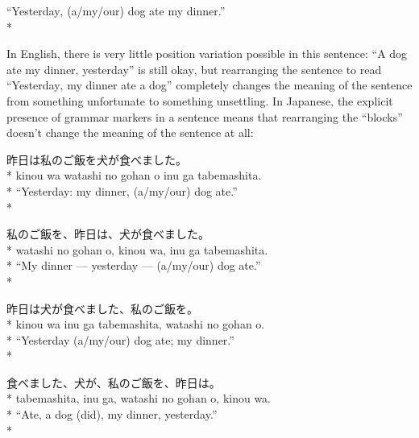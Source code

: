 \documentclass[11pt, b5paper, twoside, openright, onecolumn]{book}
\newenvironment{exampleblock}{
\setlength{\parindent}{0.6in}
\begin{minipage}[t]{\dimexpr\textwidth-\parindent}}
{\end{minipage}}
\begin{document}
\vspace{0.4cm}
\begin{exampleblock}
“Yesterday‚ (a/my/our) dog ate my dinner.” \\* 
\end{exampleblock}
\vspace{0.2cm}

In English‚ there is very little position variation possible in this sentence: “A dog ate my dinner‚ yesterday” is still okay‚ but rearranging the sentence to read “Yesterday‚ my dinner ate a dog” completely changes the meaning of the sentence from something unfortunate to something unsettling. In Japanese‚ the explicit presence of grammar markers in a sentence means that rearranging the “blocks” doesn’t change the meaning of the sentence at all:

\vspace{0.4cm}
\begin{exampleblock}
昨日は私のご飯を犬が食べました。 \\* 
kinou wa watashi no gohan o inu ga tabemashita. \\* 
“Yesterday: my dinner‚ (a/my/our) dog ate.” \\* 
\end{exampleblock}
\vspace{0.2cm}

\begin{exampleblock}
私のご飯を、昨日は、犬が食べました。 \\* 
watashi no gohan o‚ kinou wa‚ inu ga tabemashita. \\* 
“My dinner — yesterday — (a/my/our) dog ate.” \\* 
\end{exampleblock}
\vspace{0.2cm}

\begin{exampleblock}
昨日は犬が食べました、私のご飯を。 \\* 
kinou wa inu ga tabemashita‚ watashi no gohan o. \\* 
“Yesterday (a/my/our) dog ate; my dinner.” \\* 
\end{exampleblock}
\vspace{0.2cm}

\begin{exampleblock}
食べました、犬が、私のご飯を、昨日は。 \\* 
tabemashita‚ inu ga‚ watashi no gohan o‚ kinou wa. \\* 
“Ate‚ a dog (did)‚ my dinner‚ yesterday.” \\* 
\end{exampleblock}
\vspace{0.2cm}
\end{document}
